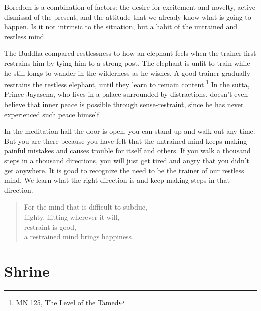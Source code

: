 Boredom is a combination of factors: the desire for excitement and
novelty, active dismissal of the present, and the attitude that we
already know what is going to happen. Is it not intrinsic to the
situation, but a habit of the untrained and restless mind.

The Buddha compared restlessness to how an elephant feels when the
trainer first restrains him by tying him to a strong post. The elephant
is unfit to train while he still longs to wander in the wilderness as he
wishes. A good trainer gradually restrains the restless elephant, until
they learn to remain content.\footnote{\href{https://suttacentral.net/mn125}{MN
  125}, The Level of the Tamed} In the sutta, Prince Jayasena, who lives
in a palace surrounded by distractions, doesn't even believe that inner
peace is possible through sense-restraint, since he has never
experienced such peace himself.

In the meditation hall the door is open, you can stand up and walk out
any time. But you are there because you have felt that the untrained
mind keeps making painful mistakes and causes trouble for itself and
others. If you walk a thousand steps in a thousand directions, you will
just get tired and angry that you didn't get anywhere. It is good to
recognize the need to be the trainer of our restless mind. We learn what
the right direction is and keep making steps in that direction.

\begin{quote}
For the mind that is difficult to subdue,\\
flighty, flitting wherever it will,\\
restraint is good,\\
a restrained mind brings happiness.

\bigskip

\end{quote}

\vspace*{-\baselineskip}

\section{Shrine}


